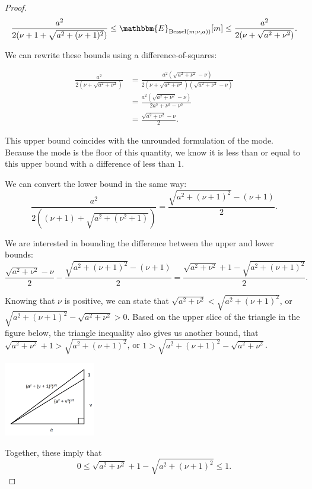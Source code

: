 \documentclass[letterpaper]{article}
\newcommand{\Bess}[1]{\textup{Bessel}\left( #1 \right)}
\begin{document}
\begin{proof}
  \begin{equation}
      \frac{a^2}{2(\nu + 1 + \sqrt{a^2 + (\nu + 1)^2})} \leq \mathbbm{E}_{\Bess{m; \nu, a})}[m]
      \leq \frac{a^2}{2(\nu + \sqrt{a^2 + \nu^2})}.
  \end{equation}
  
  We can rewrite these bounds using a difference-of-squares:
  
  \begin{align*}
      \frac{a^2}{2(\nu + \sqrt{a^2 + \nu^2})} &= 
      \frac{a^2(\sqrt{a^2 + \nu^2} - \nu)}{2(\nu + \sqrt{a^2 + \nu^2})(\sqrt{a^2 + \nu^2} - \nu)} \\
      &= \frac{a^2(\sqrt{a^2 + \nu^2} - \nu)}{2a^2 + \nu^2 - \nu^2} \\
      &= \frac{\sqrt{a^2 + \nu^2} - \nu}{2}.
  \end{align*}
  
  This upper bound coincides with the unrounded formulation of the mode. Because
  the mode is the floor of this quantity, we know it is less than or equal to
  this upper bound with a difference of less than 1.
  
  We can convert the lower bound in the same way:
  \begin{equation*}
      \frac{a^2}{2((\nu + 1) + \sqrt{a^2 + (\nu^2 + 1)})} =  \frac{\sqrt{a^2 + (\nu + 1)^2} - (\nu + 1)}{2}.
  \end{equation*}
  
  We are interested in bounding the difference between the upper and lower
  bounds:
  \begin{equation}
      \frac{\sqrt{a^2 + \nu^2} - \nu}{2} - \frac{\sqrt{a^2 + (\nu + 1)^2} - (\nu + 1)}{2} = 
      \frac{\sqrt{a^2 + \nu^2} + 1 - \sqrt{a^2 + (\nu + 1)^2}}{2}.
  \end{equation}
  
  Knowing that $\nu$ is positive, we can state that $\sqrt{a^2 + \nu^2} <
  \sqrt{a^2 + (\nu + 1)^2}$, or $\sqrt{a^2 + (\nu + 1)^2} - \sqrt{a^2 + \nu^2} >
  0$. Based on the upper slice of the triangle in the figure below, the triangle
  inequality also gives us another bound, that $\sqrt{a^2 + \nu^2} + 1 >
  \sqrt{a^2 + (\nu + 1)^2}$, or $1 > \sqrt{a^2 + (\nu + 1)^2} - \sqrt{a^2 +
  \nu^2}$.
  
  \begin{center}
  \includegraphics[width=0.3\textwidth]{figures/triangle-bessel-model}
  \end{center}
  Together, these imply that 
  \[
      0 \leq \sqrt{a^2 + \nu^2} + 1 - \sqrt{a^2 + (\nu + 1)^2} \leq 1.
  \]
  

\end{proof}
\end{document}
